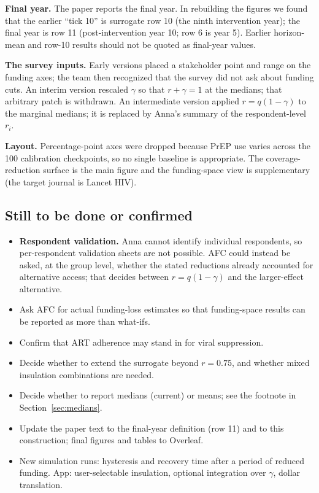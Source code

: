 \documentclass[10pt,a4paper]{article}
\begin{document}
\textbf{Final year.} The paper reports the final year. In rebuilding the figures we found that the earlier ``tick 10'' is surrogate row 10 (the ninth intervention year); the final year is row 11 (post-intervention year 10; row 6 is year 5). Earlier horizon-mean and row-10 results should not be quoted as final-year values.

\textbf{The survey inputs.} Early versions placed a stakeholder point and range on the funding axes; the team then recognized that the survey did not ask about funding cuts. An interim version rescaled $\gamma$ so that $r+\gamma=1$ at the medians; that arbitrary patch is withdrawn. An intermediate version applied $r=q(1-\gamma)$ to the marginal medians; it is replaced by Anna's summary of the respondent-level $r_i$.

\textbf{Layout.} Percentage-point axes were dropped because PrEP use varies across the 100 calibration checkpoints, so no single baseline is appropriate. The coverage-reduction surface is the main figure and the funding-space view is supplementary (the target journal is Lancet HIV).

\subsection{Still to be done or confirmed}
\begin{itemize}
\item \textbf{Respondent validation.} Anna cannot identify individual respondents, so per-respondent validation sheets are not possible. AFC could instead be asked, at the group level, whether the stated reductions already accounted for alternative access; that decides between $r=q(1-\gamma)$ and the larger-effect alternative.
\item Ask AFC for actual funding-loss estimates so that funding-space results can be reported as more than what-ifs.
\item Confirm that ART adherence may stand in for viral suppression.
\item Decide whether to extend the surrogate beyond $r=0.75$, and whether mixed insulation combinations are needed.
\item Decide whether to report medians (current) or means; see the footnote in Section~\ref{sec:medians}.
\item Update the paper text to the final-year definition (row 11) and to this construction; final figures and tables to Overleaf.
\item New simulation runs: hysteresis and recovery time after a period of reduced funding. App: user-selectable insulation, optional integration over $\gamma$, dollar translation.
\end{itemize}
\end{document}
